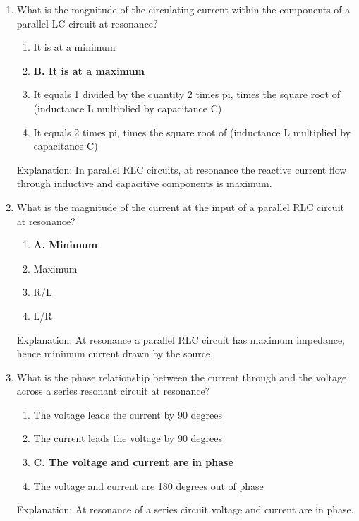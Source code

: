 \begin{enumerate}
        \item What is the magnitude of the circulating current within the components of a parallel LC circuit at resonance?
       \begin{enumerate}
       \item  It is at a minimum
        \item \textbf{B. It is at a maximum}
       \item  It equals 1 divided by the quantity 2 times pi, times the square root of (inductance L multiplied by capacitance C)
         \item  It equals 2 times pi, times the square root of (inductance L multiplied by capacitance C)
        \end{enumerate}
        \textcolor{myred}{Explanation:}
    In parallel RLC circuits, at resonance the reactive current flow through inductive and capacitive components is maximum.
        
        \item What is the magnitude of the current at the input of a parallel RLC circuit at resonance?
       \begin{enumerate}
    \item \textbf{A. Minimum}
     \item  Maximum
        \item  R/L
     \item  L/R
    \end{enumerate}
   \textcolor{myred}{Explanation:}
       At resonance a parallel RLC circuit has maximum impedance, hence minimum current drawn by the source.
       
    \item What is the phase relationship between the current through and the voltage across a series resonant circuit at resonance?
     \begin{enumerate}
        \item  The voltage leads the current by 90 degrees
        \item  The current leads the voltage by 90 degrees
     \item \textbf{C. The voltage and current are in phase}
       \item  The voltage and current are 180 degrees out of phase
      \end{enumerate}
       \textcolor{myred}{Explanation:}
    At resonance of a series circuit voltage and current are in phase.


\end{enumerate}
